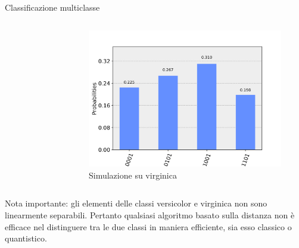 \documentclass{beamer}
\begin{document}
\begin{frame}{Classificazione multiclasse}
\begin{columns}
\begin{figure}[h]
            \end{figure}
            \begin{figure}[h]
                \centering
                \includegraphics[width=\linewidth]{gfx/multiclass_virginica}
                \caption{Simulazione su virginica}
                \label{fig:multiclass.virginica}
            \end{figure}
        \end{columns}
        Nota importante: gli elementi delle classi versicolor e virginica non sono linearmente separabili. 
        Pertanto qualsiasi algoritmo basato sulla distanza non è efficace nel distinguere tra le due classi 
        in maniera efficiente, sia esso classico o quantistico. 
    \end{frame}
\end{document}
